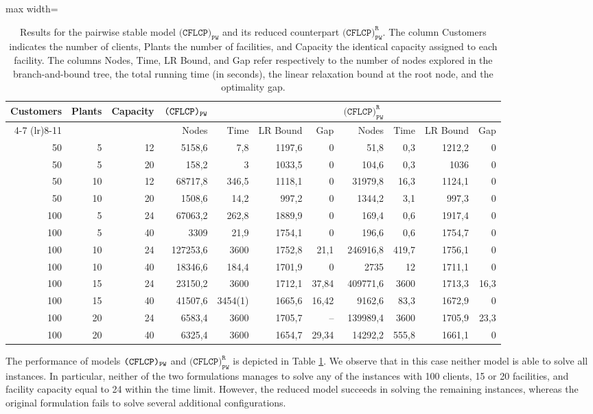 \documentclass[preprint,11pt,authoryear]{elsarticle}
\begin{document}
\begin{table}%
\centering
\begin{adjustbox}{max width=\textwidth}
\begin{tabular}{rrr rrrr rrrr}
\toprule
Customers & Plants & Capacity & ${\normalfont\texttt{(CFLCP)}_{\texttt{PW}}}$ & & & & $\texttt{(CFLCP)}_{\texttt{PW}}^\texttt{R}$ & & & \\
\cmidrule(lr){4-7} \cmidrule(lr){8-11}
& & & Nodes & Time & LR Bound & Gap & Nodes & Time & LR Bound & Gap \\
\midrule
50&5&12&5158,6&7,8&1197,6&0&51,8&0,3&1212,2&0 \\
50&5&20&158,2&3&1033,5&0&104,6&0,3&1036&0 \\[2mm]
50&10&12&68717,8&346,5&1118,1&0&31979,8&16,3&1124,1&0 \\
50&10&20&1508,6&14,2&997,2&0&1344,2&3,1&997,3&0 \\[2mm]
100&5&24&67063,2&262,8&1889,9&0&169,4&0,6&1917,4&0 \\
100&5&40&3309&21,9&1754,1&0&196,6&0,6&1754,7&0 \\[2mm]
100&10&24&127253,6&3600&1752,8&21,1&246916,8&419,7&1756,1&0 \\
100&10&40&18346,6&184,4&1701,9&0&2735&12&1711,1&0 \\[2mm]
100&15&24&23150,2&3600&1712,1&37,84&409771,6&3600&1713,3&16,3 \\
100&15&40&41507,6&3454(1)&1665,6&16,42&9162,6&83,3&1672,9&0 \\[2mm]
100&20&24&6583,4&3600&1705,7&--&139989,4&3600&1705,9&23,3 \\
100&20&40&6325,4&3600&1654,7&29,34&14292,2&555,8&1661,1&0 \\
\bottomrule
\end{tabular}
\end{adjustbox}
\caption{Results for the pairwise stable model \(\texttt{(CFLCP)}_{\texttt{PW}}\) and its reduced counterpart \(\texttt{(CFLCP)}_{\texttt{PW}}^\texttt{R}\). The column Customers indicates the number of clients, Plants the number of facilities, and Capacity the identical capacity assigned to each facility. The columns Nodes, Time, LR Bound, and Gap refer respectively to the number of nodes explored in the branch-and-bound tree, the total running time (in seconds), the linear relaxation bound at the root node, and the optimality gap.}
\label{tab:pairwise-results}
\end{table}

The performance of models ${\normalfont\texttt{(CFLCP)}_{\texttt{PW}}}$ and $\texttt{(CFLCP)}_{\texttt{PW}}^\texttt{R}$ is depicted in Table \ref{tab:pairwise-results}. We observe that in this case neither model is able to solve all instances. In particular, neither of the two formulations manages to solve any of the instances with 100 clients, 15 or 20 facilities, and facility capacity equal to 24 within the time limit. However, the reduced model succeeds in solving the remaining instances, whereas the original formulation fails to solve several additional configurations.
\end{document}
